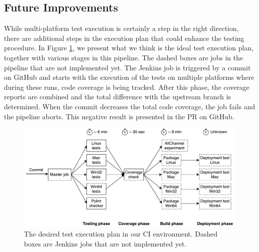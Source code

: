 \subsection{Future Improvements}
While multi-platform test execution is certainly a step in the right direction, there are additional steps in the execution plan that could enhance the testing procedure. In Figure \ref{fig:jenkins-pipeline}, we present what we think is the ideal test execution plan, together with various stages in this pipeline. The dashed boxes are jobs in the pipeline that are not implemented yet. The Jenkins job is triggered by a commit on GitHub and starts with the execution of the tests on multiple platforms where during these runs, code coverage is being tracked. After this phase, the coverage reports are combined and the total difference with the upstream branch is determined. When the commit decreases the total code coverage, the job fails and the pipeline aborts. This negative result is presented in the PR on GitHub.\\

\begin{figure}[h!]
	\centering
	\includegraphics[width=0.9\columnwidth]{images/improving_qa/jenkins_pipeline}
	\caption{The desired test execution plan in our CI environment. Dashed boxes are Jenkins jobs that are not implemented yet.}
	\label{fig:jenkins-pipeline}
\end{figure}

